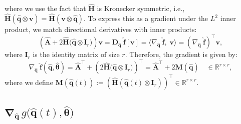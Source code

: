 where we use the fact that $\hat{\mathbf{H}}$ is Kronecker symmetric, i.e., $\hat{\mathbf{H}}(\hat{\mathbf{q}} \otimes \mathbf{v}) = \hat{\mathbf{H}}(\mathbf{v} \otimes \hat{\mathbf{q}})$.
To express this as a gradient under the $L^2$ inner product, we match directional derivatives with inner products:\\
$$
\left( \hat{\mathbf{A}} + 2\hat{\mathbf{H}}\bigl( \hat{\mathbf{q}} \otimes \mathbf{I}_r \bigr) \right) \mathbf{v} = \bm{D}_{\hat{\mathbf{q}}}~\hat{\mathbf{f}}[\mathbf{v}] = \langle \nabla_{\hat{\mathbf{q}}}~\hat{\mathbf{f}},\;\mathbf{v} \rangle = \left( \nabla_{\hat{\mathbf{q}}}~\hat{\mathbf{f}} \right)^{\top}  \mathbf{v},
$$
where $\mathbf{I}_r$ is the identity matrix of size $r$. Therefore, the gradient is given by:\\
\begin{equation}
    \nabla_{\hat{\mathbf{q}}}~\hat{\mathbf{f}}(\hat{\mathbf{q}}, \hat{\bm{\theta}}) = \hat{\mathbf{A}}^{\top} + \left( 2\hat{\mathbf{H}}\bigl( \hat{\mathbf{q}} \otimes \mathbf{I}_r \bigr) \right)^{\top} = \hat{\mathbf{A}}^{\top} + 2\mathbf{M}(\hat{\mathbf{q}}) \quad \in \mathbb{R}^{r \times r},
    \label{eq:gradient_1}
\end{equation}
where we define $\mathbf{M}(\hat{\mathbf{q}}(t)) := \left( \hat{\mathbf{H}}( \hat{\mathbf{q}}(t) \otimes \mathbf{I}_r ) \right)^{\top} \in \mathbb{R}^{r \times r}$.

\subsection{$\bm{\nabla}_{\hat{\mathbf{q}}}\,g\bigl(\hat{\mathbf{q}}(t),\hat{\bm{\theta}}\bigr)$}

